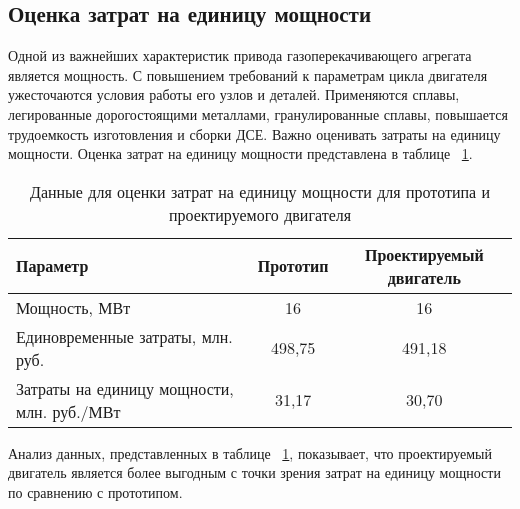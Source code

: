 \subsection{Оценка затрат на единицу мощности}
Одной из важнейших характеристик привода газоперекачивающего агрегата является мощность. С повышением требований к
параметрам цикла двигателя ужесточаются условия работы его узлов и деталей. Применяются сплавы, легированные
дорогостоящими металлами, гранулированные сплавы, повышается трудоемкость изготовления и сборки ДСЕ. Важно оценивать
затраты на единицу мощности. Оценка затрат на единицу мощности представлена в таблице ~\ref{tab:economics-unit-power}.
\begin{longtable}{|p{6cm}|c|c|}
    \caption{Данные для оценки затрат на единицу мощности для прототипа и проектируемого двигателя} \label{tab:economics-unit-power}
    \hline
    \textbf{Параметр} &
    \textbf{Прототип} &
    \textbf{Проектируемый двигатель} \\\hline
    \endhead
    Мощность, МВт & 16 & 16 \\\hline
    Единовременные затраты, млн. руб. & 498,75 & 491,18 \\\hline
    Затраты на единицу мощности, млн. руб./МВт & 31,17 & 30,70 \\\hline
\end{longtable}
Анализ данных, представленных в таблице ~\ref{tab:economics-unit-power}, показывает, что проектируемый двигатель является более выгодным с точки зрения
затрат на единицу мощности по сравнению с прототипом.

